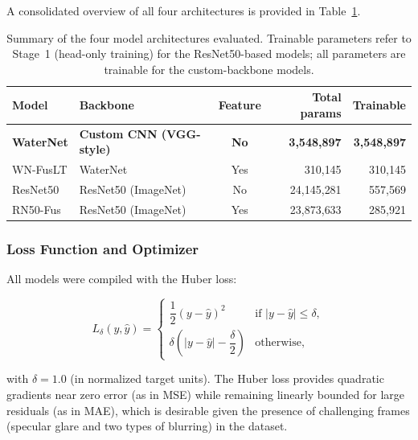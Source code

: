 A consolidated overview of all four architectures is provided in
Table~\ref{tab:model_summary}.

\begin{table}[htbp]
    \caption{Summary of the four model architectures evaluated. Trainable
             parameters refer to Stage~1 (head-only training) for the
             ResNet50-based models; all parameters are trainable for the
             custom-backbone models.}
    \begin{center}
        \begin{tabular}{|l|l|c|r|r|}
        \hline
        \textbf{Model} & \textbf{Backbone} & \textbf{Feature} &
        \textbf{Total params} & \textbf{Trainable} \\
        \hline
        \textbf{WaterNet}   & \textbf{Custom CNN (VGG-style)} & \textbf{No}  &  \textbf{3{,}548{,}897} &  \textbf{3{,}548{,}897} \\
        \hline
        WN-FusLT   & WaterNet      & Yes &    310{,}145   &    310{,}145   \\
        \hline
        ResNet50   & ResNet50 (ImageNet)    & No  & 24{,}145{,}281 &    557{,}569   \\
        \hline
        RN50-Fus   & ResNet50 (ImageNet)    & Yes & 23{,}873{,}633 &    285{,}921   \\
        \hline
        \end{tabular}
    \label{tab:model_summary}
    \end{center}
\end{table}

\subsubsection{Loss Function and Optimizer}
\label{subsubsec:loss_optim}

All models were compiled with the Huber loss:

\begin{equation}
    L_\delta(y,\hat{y}) =
    \begin{cases}
        \dfrac{1}{2}(y - \hat{y})^2
            & \text{if } |y - \hat{y}| \leq \delta, \\[8pt]
        \delta\!\left(|y - \hat{y}| - \dfrac{\delta}{2}\right)
            & \text{otherwise,}
    \end{cases}
    \label{eq:huber}
\end{equation}

\noindent with $\delta = 1.0$ (in normalized target units). The Huber loss provides quadratic gradients near zero error (as in MSE) while remaining linearly bounded for large residuals (as in MAE), which is desirable given the presence of challenging frames (specular glare and two types of blurring) in the dataset.

